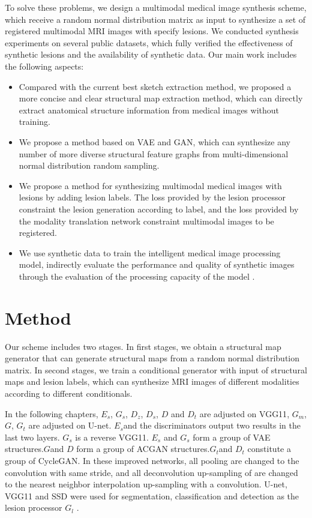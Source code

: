 \documentclass[runningheads]{llncs}
\begin{document}
To solve these problems, we design a multimodal medical image synthesis scheme, which receive a random normal distribution matrix as input to synthesize a set of registered multimodal MRI images with specify lesions. We conducted synthesis experiments on several public datasets, which fully verified the effectiveness of synthetic lesions and the availability of synthetic data. Our main work includes the following aspects:
\begin{itemize}
	\item Compared with the current best sketch extraction method, we proposed a more concise and clear structural map extraction method, which can directly extract anatomical structure information from medical images without training.
	
	\item We propose a method based on VAE and GAN, which can synthesize any number of more diverse structural feature graphs from multi-dimensional normal distribution random sampling.
	
	\item We propose a method for synthesizing multimodal medical images with lesions by adding lesion labels. The loss provided by the lesion processor constraint the lesion generation according to label, and the loss provided by the modality translation network constraint multimodal images to be registered.
	
	\item We use synthetic data to train the intelligent medical image processing model, indirectly evaluate the performance and quality of synthetic images through the evaluation of the processing capacity of the model .
\end{itemize}

\section{Method}
\label{method}
Our scheme includes two stages. In first stages, we obtain a structural map generator that can generate structural maps from a random normal distribution matrix. In second stages, we train a conditional generator with input of structural maps and lesion labels, which can synthesize MRI images of different modalities according to different conditionals.

In the following chapters, $E_s $, $G_s$, $D_{z} $, $D_{s} $, $D $ and $D_{t}$ are adjusted on VGG11\cite{102simonyan2014very}, $G_m $, $G$, $G_t$ are adjusted on U-net\cite{6zhu2017unpaired}. $E_s$and the discriminators output two results in the last two layers. $G_s$ is a reverse VGG11. $E_s $ and $G_s$ form a group of VAE\cite{88rezende2014stochastic} structures.$G$and $D$ form a group of ACGAN\cite{98odena2016conditional} structures.$G_t$and $D_t $ constitute a group of CycleGAN. In these improved networks, all pooling are changed to the convolution with same stride, and all deconvolution up-sampling of are changed to the nearest neighbor interpolation up-sampling with a convolution. U-net, VGG11 and SSD\cite{109liu2016ssd:} were used for segmentation, classification and detection as the lesion processor $G_l$ .
\end{document}
